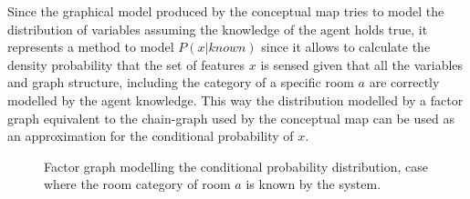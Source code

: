Since the graphical model produced by the conceptual map tries to model the distribution of
variables assuming the knowledge of the agent holds true, it represents a method to model
$P(x|known)$ since it allows to calculate the density probability that the set of features $x$ is
sensed given that all the variables and graph structure, including the category of
a specific room $a$ are correctly modelled by the agent knowledge.
This way the distribution modelled by a factor graph equivalent to the chain-graph used by
the conceptual map can be used as an approximation for the conditional probability of $x$.

\begin{figure}[h]
\centering
{}

\caption{Factor graph modelling the conditional probability distribution, case where the
         room category of room $a$ is known by the system.}
\end{figure}


